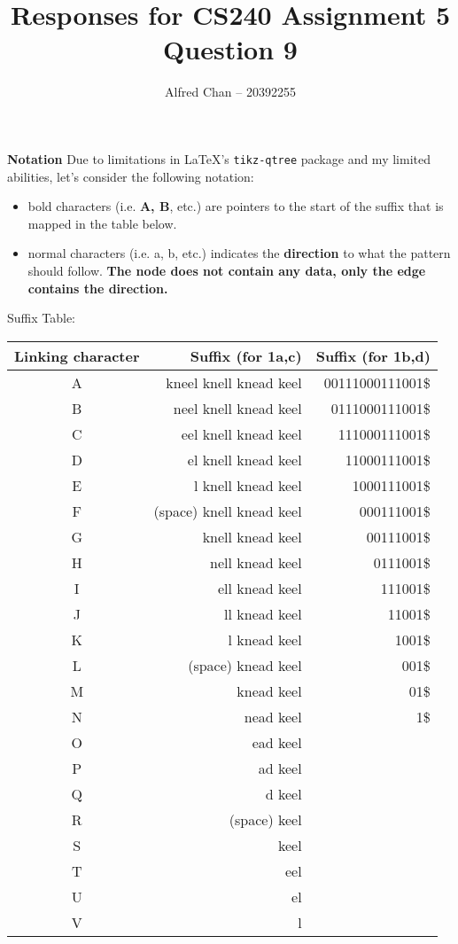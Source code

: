 \documentclass[12pt]{article}
\title{Responses for CS240 Assignment 5 Question 9}
\author{Alfred Chan -- 20392255}
\begin{document}
\maketitle
{\bf Notation} Due to limitations in \LaTeX's \texttt{tikz-qtree} package and my limited abilities, let's consider the following notation:
\begin{itemize}
\item bold characters (i.e. {\bf A, B}, etc.) are pointers to the start of the suffix that is mapped in the table below.
\item normal characters (i.e. a, b, etc.) indicates the {\bf direction} to what the pattern should follow. {\bf The node does not contain any data, only the edge contains the direction.}
\end{itemize}

Suffix Table:\\
\begin{tabular}{c|r|r}
Linking character & Suffix (for 1a,c) & Suffix (for 1b,d)\\\hline
A & kneel knell knead keel		& 00111000111001\$\\\hline
B & neel knell knead keel			& 0111000111001\$\\\hline
C & eel knell knead keel			& 111000111001\$\\\hline
D & el knell knead keel				& 11000111001\$\\\hline
E & l knell knead keel				& 1000111001\$\\\hline
F & (space) knell knead keel	& 000111001\$\\\hline
G & knell knead keel					& 00111001\$\\\hline
H & nell knead keel						& 0111001\$\\\hline
I & ell knead keel						& 111001\$\\\hline
J & ll knead keel							& 11001\$\\\hline
K & l knead keel							& 1001\$\\\hline
L & (space) knead keel				& 001\$\\\hline
M & knead keel								& 01\$\\\hline
N & nead keel									& 1\$\\\hline
O & ead keel\\\hline
P & ad keel\\\hline
Q & d keel\\\hline
R & (space) keel\\\hline
S & keel\\\hline
T & eel\\\hline
U & el\\\hline
V & l\\\hline
\end{tabular}\\
\end{document}
